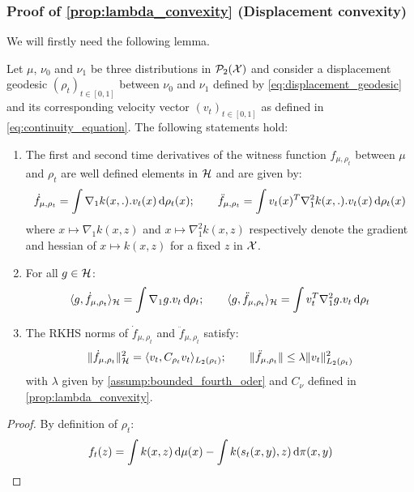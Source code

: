 \subsubsection{Proof of \cref{prop:lambda_convexity} (Displacement convexity)}

We will firstly need the following lemma.

\begin{lemma}\label{lem:derivatives_witness}
	Let  $\mu$, $\nu_0$ and $\nu_1$ be three distributions in $\mathcal{P}_2({{\mathcal X}})$ and consider a displacement geodesic $(\rho_t)_{t\in[0,1]}$ between $\nu_0$ and $\nu_1$  defined by \cref{eq:displacement_geodesic} 
	and its corresponding velocity vector $(v_t)_{t\in [0,1]}$ as defined in \cref{eq:continuity_equation}. The following statements hold:
	\begin{enumerate}
		\item The first and second time derivatives of the witness function $f_{\mu,\rho_t}$ between $\mu$ and $\rho_t$ are well defined elements in $ {{\mathcal H}}$ and are given by:
		\begin{align}\label{eq:derivatives_witness}
		\dot{f}_{\mu,\rho_t} = \int \nabla_1 k(x,.).v_t(x) \mathop{}\!\mathrm{d} \rho_t(x); \qquad
		\ddot{f}_{\mu,\rho_t} = \int v_t(x)^T\nabla_1^2 k(x,.).v_t(x) \mathop{}\!\mathrm{d} \rho_t(x)
		\end{align}
		where $ x \mapsto \nabla_1 k(x,z)$ and $x\mapsto \nabla_1^2 k(x,z)$ respectively denote the gradient and hessian of $x\mapsto k(x,z)$ for a fixed $z$ in ${{\mathcal X}}$.
		\item For all $g\in {{\mathcal H}}$:
		\begin{align}\label{eq:inner_prod_deriative_witness}
		\langle g,\dot{f}_{\mu,\rho_t}\rangle_{{{\mathcal H}}} = \int \nabla_1 g.v_t \mathop{}\!\mathrm{d} \rho_t; \qquad
		\langle g,  \ddot{f}_{\mu,\rho_t}\rangle_{{{\mathcal H}}} = \int v_t^T\nabla_1^2 g.v_t \mathop{}\!\mathrm{d} \rho_t
		\end{align}
		\item The RKHS norms of $\dot{f}_{\mu,\rho_t}$ and $\ddot{f}_{\mu,\rho_t}$ satisfy:
		\begin{align}\label{eq:norm_derivative_witness}
		\Vert \dot{f}_{\mu,\rho_t}\Vert_{{{\mathcal H}}}^2 = \langle v_t,C_{\rho_t} v_t \rangle_{L_2(\rho_t)}; \qquad  \Vert \ddot{f}_{\mu,\rho_t} \Vert\leq \lambda \Vert v_t \Vert^2_{L_2(\rho_t)}  
		\end{align}
		with $\lambda$ given by \cref{assump:bounded_fourth_oder} and $C_{\nu}$ defined in \cref{prop:lambda_convexity}. 
	\end{enumerate} 
\end{lemma}
\begin{proof}
	By definition of $\rho_{t}$:
	\[
	f_t(z)= \int k(x,z)\mathop{}\!\mathrm{d} \mu(x) - \int k(s_t(x,y),z)\mathop{}\!\mathrm{d} \pi(x,y)
	\]
\end{proof}


